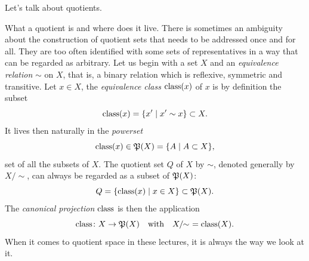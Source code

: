 Let's talk about quotients.

\begin{Article}{What a quotient is and where does it live.}
  There is sometimes an ambiguity about the construction of quotient sets that needs to be addressed once and for all.
  They are too often identified with some sets of representatives in a way that can be regarded as arbitrary.
  Let us begin with a set $X$ and an \emph{equivalence relation} $\sim$ on $X$,
  that is,
  a binary relation which is reflexive,
  symmetric and transitive.
  Let $x \in X$,
  the \emph{equivalence class} $\operatorname{class}(x)$ of $x$ is by definition the subset
  $$%
    \Class(x) = \{ x' \mid x' \sim x \} \subset X.
    $$%
  It lives then naturally in the \emph{powerset}
  $$%
    \Class(x) \in \fP(X) = \{ A \mid A \subset X\},
    $$%
  set of all the subsets of $X$.
  The quotient set $Q$ of $X$ by $\sim$,
  denoted generally by $X/\!\!\sim$,
  can always be regarded as a subset of ${\mathfrak P}(X)$:
  $$%
    Q = \{ \Class(x) \mid x \in X \} \subset \fP(X).
    $$%
  The \emph{canonical projection} $\operatorname{class}$ is then the application
  $$%
    \Class \colon X \to \fP(X)
    \quad \text{with} \quad
    X/\!\!\sim \ = \Class(X).
    $$%
  When it comes to quotient space in these lectures,
  it is always the way we look at it.
\end{Article}

